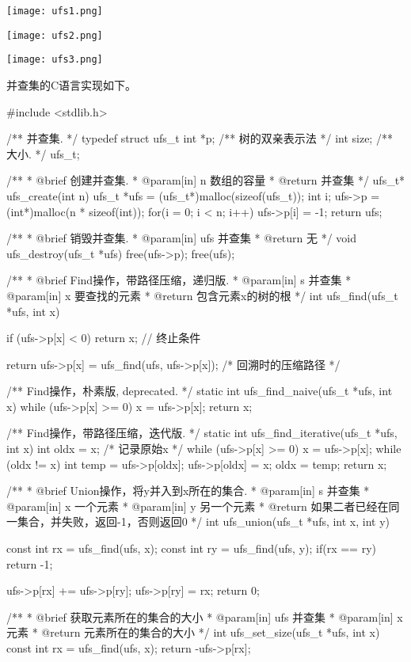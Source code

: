\begin{center}
\texttt{[image: ufs1.png]}\\
\label{fig:ufs1}
\end{center}

\begin{center}
\texttt{[image: ufs2.png]}\\
\label{fig:ufs2}
\end{center}

\begin{center}
\texttt{[image: ufs3.png]}\\
\label{fig:ufs3}
\end{center}

并查集的C语言实现如下。

\begin{Codex}[label=ufs.c]
#include <stdlib.h>

/** 并查集. */
typedef struct ufs_t {
    int *p;     /** 树的双亲表示法 */
    int size;   /** 大小. */
} ufs_t;

/**
 * @brief 创建并查集.
 * @param[in] n 数组的容量
 * @return 并查集
 */
ufs_t* ufs_create(int n) {
    ufs_t *ufs = (ufs_t*)malloc(sizeof(ufs_t));
    int i;
    ufs->p = (int*)malloc(n * sizeof(int));
    for(i = 0; i < n; i++)
        ufs->p[i] = -1;
    return ufs;
}

/**
 * @brief 销毁并查集.
 * @param[in] ufs 并查集
 * @return 无
 */
void ufs_destroy(ufs_t *ufs) {
    free(ufs->p);
    free(ufs);
}

/**
 * @brief Find操作，带路径压缩，递归版.
 * @param[in] s 并查集
 * @param[in] x 要查找的元素
 * @return 包含元素x的树的根
 */
int ufs_find(ufs_t *ufs, int x) {
    if (ufs->p[x] < 0) return x; // 终止条件

    return ufs->p[x] = ufs_find(ufs, ufs->p[x]); /* 回溯时的压缩路径 */
}

/** Find操作，朴素版, deprecated. */
static int ufs_find_naive(ufs_t *ufs, int x) {
    while (ufs->p[x] >= 0) {
        x = ufs->p[x];
    }
    return x;
}

/** Find操作，带路径压缩，迭代版. */
static int ufs_find_iterative(ufs_t *ufs, int x) {
    int oldx = x; /* 记录原始x */
    while (ufs->p[x] >= 0) {
        x = ufs->p[x];
    }
    while (oldx != x) {
        int temp = ufs->p[oldx];
        ufs->p[oldx] = x;
        oldx = temp;
    }
    return x;
}

/**
 * @brief Union操作，将y并入到x所在的集合.
 * @param[in] s 并查集
 * @param[in] x 一个元素
 * @param[in] y 另一个元素
 * @return 如果二者已经在同一集合，并失败，返回-1，否则返回0
 */
int ufs_union(ufs_t *ufs, int x, int y) {
    const int rx = ufs_find(ufs, x);
    const int ry = ufs_find(ufs, y);
    if(rx == ry) return -1;

    ufs->p[rx] += ufs->p[ry];
    ufs->p[ry] = rx;
    return 0;
}

/**
 * @brief 获取元素所在的集合的大小
 * @param[in] ufs 并查集
 * @param[in] x 元素
 * @return 元素所在的集合的大小
 */
int ufs_set_size(ufs_t *ufs, int x) {
    const int rx = ufs_find(ufs, x);
    return -ufs->p[rx];
}
\end{Codex}


